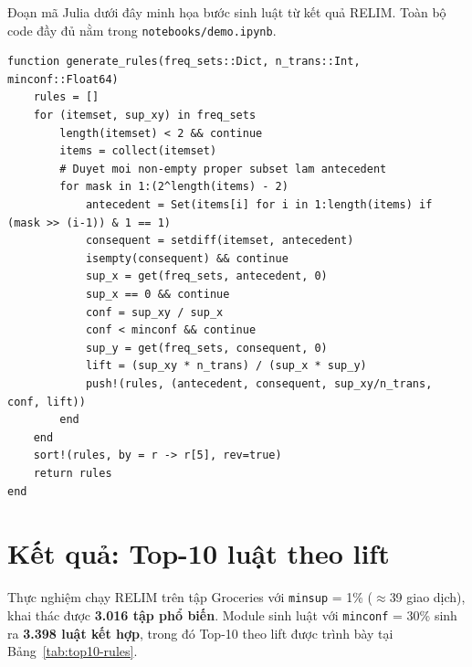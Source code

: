 \documentclass[12pt,a4paper]{report}
\begin{document}
Đoạn mã Julia dưới đây minh họa bước sinh luật từ kết quả RELIM. Toàn bộ
code đầy đủ nằm trong \texttt{notebooks/demo.ipynb}.

\begin{lstlisting}[style=julia, caption={Hàm sinh luật kết hợp từ frequent itemsets},
                   label={lst:rules}]
function generate_rules(freq_sets::Dict, n_trans::Int, minconf::Float64)
    rules = []
    for (itemset, sup_xy) in freq_sets
        length(itemset) < 2 && continue
        items = collect(itemset)
        # Duyet moi non-empty proper subset lam antecedent
        for mask in 1:(2^length(items) - 2)
            antecedent = Set(items[i] for i in 1:length(items) if (mask >> (i-1)) & 1 == 1)
            consequent = setdiff(itemset, antecedent)
            isempty(consequent) && continue
            sup_x = get(freq_sets, antecedent, 0)
            sup_x == 0 && continue
            conf = sup_xy / sup_x
            conf < minconf && continue
            sup_y = get(freq_sets, consequent, 0)
            lift = (sup_xy * n_trans) / (sup_x * sup_y)
            push!(rules, (antecedent, consequent, sup_xy/n_trans, conf, lift))
        end
    end
    sort!(rules, by = r -> r[5], rev=true)
    return rules
end
\end{lstlisting}

\section{Kết quả: Top-10 luật theo lift}

Thực nghiệm chạy RELIM trên tập Groceries với \texttt{minsup} = 1\% ($\approx$39 giao
dịch), khai thác được \textbf{3.016 tập phổ biến}. Module sinh luật với
\texttt{minconf} = 30\% sinh ra \textbf{3.398 luật kết hợp}, trong đó Top-10 theo lift
được trình bày tại Bảng~\ref{tab:top10-rules}.
\end{document}
